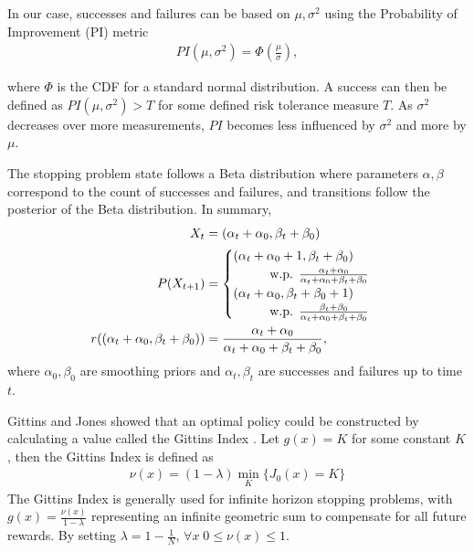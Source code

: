 In our case, successes and failures can be based on $\mu, \sigma^2$ using the Probability of Improvement (PI) metric
\begin{align}
  PI(\mu, \sigma^2) = \Phi(\frac{\mu}{\sigma}),
\end{align}

where $\Phi$ is the CDF for a standard normal distribution. A success can then be defined as $PI(\mu, \sigma^2) > T$ for some defined risk tolerance measure $T$. As $\sigma^2$ decreases over more measurements, $PI$ becomes less influenced by $\sigma^2$ and more by $\mu$. 

The stopping problem state follows a Beta distribution where parameters $\alpha,\beta$ correspond to the count of successes and failures, and transitions follow the posterior of the Beta distribution. In summary,
\begin{align}
\begin{split}
  X_t &= (\alpha_t + \alpha_0, \beta_t + \beta_0) \\
  P(X_{t+1}) &=
  \begin{cases}
      (\alpha_t + \alpha_0 + 1, \beta_t + \beta_0)
      \\ \hspace*{1cm}\text{w.p. } \frac{\alpha_t + \alpha_0}{\alpha_t + \alpha_0 + \beta_t + \beta_0}\\
      (\alpha_t + \alpha_0, \beta_t + \beta_0 + 1)
      \\ \hspace*{1cm}\text{w.p. } \frac{\beta_t + \beta_0}{\alpha_t + \alpha_0 + \beta_t + \beta_0}
  \end{cases}\\
  r((\alpha_t + \alpha_0, \beta_t + \beta_0)) &= \frac{\alpha_t + \alpha_0}{\alpha_t + \alpha_0 + \beta_t + \beta_0},\\
\end{split}
\end{align}
where $\alpha_0,\beta_0$ are smoothing priors and $\alpha_t,\beta_t$ are successes and failures up to time $t$.

Gittins and Jones showed that an optimal policy could be constructed by calculating a value called the Gittins Index \citep{doi:10.1002/9781118596333.ch24}. Let $g(x) = K$ for some constant $K$, then the Gittins Index is defined as
\begin{align}
  \nu(x) = (1-\lambda)\min_{K} \{J_0(x) = K\}
\end{align}
The Gittins Index is generally used for infinite horizon stopping problems, with $g(x)=\frac{\nu(x)}{1-\lambda}$ representing an infinite geometric sum to compensate for all future rewards. By setting $\lambda=1-\frac{1}{N}$, $\forall x \; 0 \leq \nu(x) \leq 1$.

